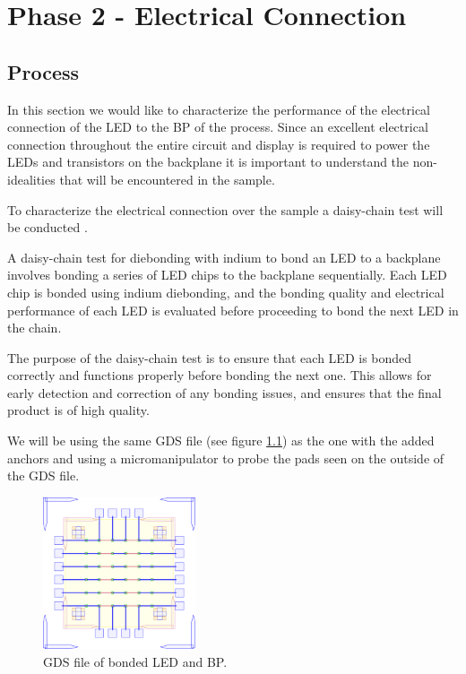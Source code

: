 \chapter{Phase 2 - Electrical Connection}
\label{sec:Ch3_elec}

\section{Process}
In this section we would like to characterize the performance of the electrical connection of the LED to the BP of the process. Since an excellent electrical connection throughout the entire circuit and display is required to power the LEDs and transistors on the backplane it is important to understand the non-idealities that will be encountered in the sample.

To characterize the electrical connection over the sample a daisy-chain test will be conducted \cite{daisychainTest}.

A daisy-chain test for diebonding with indium to bond an LED to a backplane involves bonding a series of LED chips to the backplane sequentially. Each LED chip is bonded using indium diebonding, and the bonding quality and electrical performance of each LED is evaluated before proceeding to bond the next LED in the chain.

The purpose of the daisy-chain test is to ensure that each LED is bonded correctly and functions properly before bonding the next one. This allows for early detection and correction of any bonding issues, and ensures that the final product is of high quality.

We will be using the same GDS file (see figure \ref{fig:ch3_gds_bp_led_anchors}) as the one with the added anchors and using a micromanipulator to probe the pads seen on the outside of the GDS file.


\begin{figure}
    \centering
    \includegraphics[width=0.4\textwidth]{Main/Ch2/DC_DieBTest_V5.GDStex_output.pdf}
    \caption{GDS file of bonded LED and BP. }
    \label{fig:ch3_gds_bp_led_anchors}
\end{figure}


